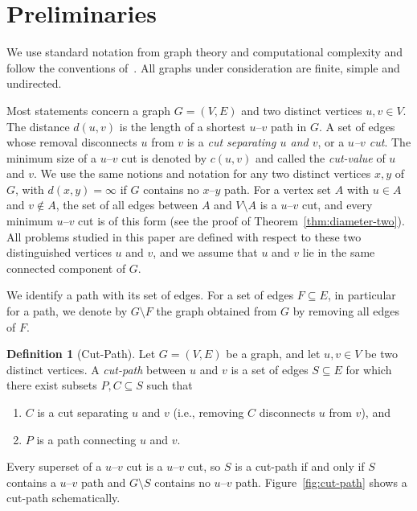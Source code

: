 \documentclass[a4paper,fleqn]{cas-sc}
\numberwithin{equation}{section}
\theoremstyle{definition}
\newtheorem{definition}{Definition}[section]
\theoremstyle{plain}
\theoremstyle{remark}
\begin{document}
\section{Preliminaries}
\label{sec:fundamentals}

We use standard notation from graph theory and computational complexity and follow the conventions of~\cite{Diestel2025,Cormen2022}.
All graphs under consideration are finite, simple and undirected.

Most statements concern a graph $G = (V, E)$ and two distinct vertices $u, v \in V$.
The distance $d(u, v)$ is the length of a shortest $u$--$v$ path in $G$.
A set of edges whose removal disconnects $u$ from $v$ is a \emph{cut separating $u$ and $v$}, or a \emph{$u$--$v$ cut}.
The minimum size of a $u$--$v$ cut is denoted by $c(u, v)$ and called the \emph{cut-value} of $u$ and $v$.
We use the same notions and notation for any two distinct vertices $x, y$ of $G$, with $d(x, y) = \infty$ if $G$ contains no $x$--$y$ path.
For a vertex set $A$ with $u \in A$ and $v \notin A$, the set of all edges between $A$ and $V \setminus A$ is a $u$--$v$ cut, and every minimum $u$--$v$ cut is of this form (see the proof of Theorem~\ref{thm:diameter-two}).
All problems studied in this paper are defined with respect to these two distinguished vertices $u$ and $v$, and we assume that $u$ and $v$ lie in the same connected component of $G$.

We identify a path with its set of edges.
For a set of edges $F \subseteq E$, in particular for a path, we denote by $G \setminus F$ the graph obtained from $G$ by removing all edges of $F$.

\begin{definition}[Cut-Path]
\label{def:cut-path}
Let $G = (V, E)$ be a graph, and let $u, v \in V$ be two distinct vertices.
A \emph{cut-path} between $u$ and $v$ is a set of edges $S \subseteq E$ for which there exist subsets $P, C \subseteq S$ such that
    \begin{enumerate}
        \item $C$ is a cut separating $u$ and $v$ (i.e., removing $C$ disconnects $u$ from $v$), and
        \item $P$ is a path connecting $u$ and $v$.
    \end{enumerate}
\end{definition}

Every superset of a $u$--$v$ cut is a $u$--$v$ cut, so $S$ is a cut-path if and only if $S$ contains a $u$--$v$ path and $G \setminus S$ contains no $u$--$v$ path.
Figure~\ref{fig:cut-path} shows a cut-path schematically.
\end{document}
